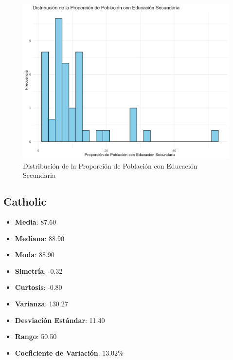 \documentclass{article}
\begin{document}
\begin{figure}[h!]
\centering
\includegraphics[width=\textwidth]{Histogramas/histogram_education.png}
\caption{Distribución de la Proporción de Población con Educación Secundaria}
\end{figure}

\subsection{Catholic}
\begin{itemize}
    \item \textbf{Media}: 87.60
    \item \textbf{Mediana}: 88.90
    \item \textbf{Moda}: 88.90
    \item \textbf{Simetría}: -0.32
    \item \textbf{Curtosis}: -0.80
    \item \textbf{Varianza}: 130.27
    \item \textbf{Desviación Estándar}: 11.40
    \item \textbf{Rango}: 50.50
    \item \textbf{Coeficiente de Variación}: 13.02\%
\end{itemize}
\end{document}
